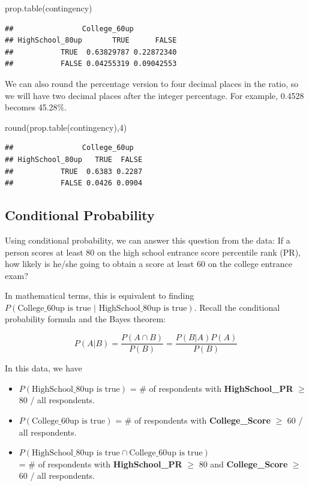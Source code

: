 \documentclass[
]{article}
\newenvironment{Shaded}{\begin{snugshade}}{\end{snugshade}}
\newcommand{\DecValTok}[1]{\textcolor[rgb]{0.00,0.00,0.81}{#1}}
\newcommand{\FunctionTok}[1]{\textcolor[rgb]{0.00,0.00,0.00}{#1}}
\newcommand{\NormalTok}[1]{#1}
\begin{document}
\begin{Shaded}
\begin{Highlighting}[]
\FunctionTok{prop.table}\NormalTok{(contingency)}
\end{Highlighting}
\end{Shaded}

\begin{verbatim}
##                College_60up
## HighSchool_80up       TRUE      FALSE
##           TRUE  0.63829787 0.22872340
##           FALSE 0.04255319 0.09042553
\end{verbatim}

We can also round the percentage version to four decimal places in the
ratio, so we will have two decimal places after the integer percentage.
For example, 0.4528 becomes 45.28\%.

\begin{Shaded}
\begin{Highlighting}[]
\FunctionTok{round}\NormalTok{(}\FunctionTok{prop.table}\NormalTok{(contingency),}\DecValTok{4}\NormalTok{)}
\end{Highlighting}
\end{Shaded}

\begin{verbatim}
##                College_60up
## HighSchool_80up   TRUE  FALSE
##           TRUE  0.6383 0.2287
##           FALSE 0.0426 0.0904
\end{verbatim}

\hypertarget{conditional-probability}{%
\subsection{Conditional Probability}\label{conditional-probability}}

Using conditional probability, we can answer this question from the
data: If a person scores at least 80 on the high school entrance score
percentile rank (PR), how likely is he/she going to obtain a score at
least 60 on the college entrance exam?

In mathematical terms, this is equivalent to finding
\(P(\text{College$\_$60up is true } \vert \text{ HighSchool$\_$80up is true})\).
Recall the conditional probability formula and the Bayes theorem:

\[P(A|B) = \frac{P(A \cap B)}{P(B)} = \frac{P(B|A)P(A)}{P(B)}\]

In this data, we have

\begin{itemize}
\item
  \(P(\text{HighSchool$\_$80up is true})\) = \# of respondents with
  \textbf{HighSchool\_PR} \(\geq\) 80 / all respondents.
\item
  \(P(\text{College$\_$60up is true})\) = \# of respondents with
  \textbf{College\_Score} \(\geq\) 60 / all respondents.
\item
  \(P(\text{HighSchool$\_$80up is true} \cap \text{College$\_$60up is true})\)\\
  = \# of respondents with \textbf{HighSchool\_PR} \(\geq\) 80 and
  \textbf{College\_Score} \(\geq\) 60 / all respondents.
\end{itemize}
\end{document}
